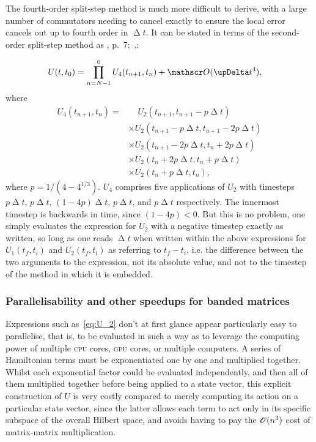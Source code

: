 The fourth-order split-step method is much more difficult to derive, with a large number of commutators needing to cancel exactly to ensure the local error cancels out up to fourth order in $\upDelta t$. It can be stated in terms of the second-order split-step method as 
\citeleft{}, p.~7;~,\citeright:

\begin{align}
U(t, t_0) &= \prod_{n=N-1}^0 U_4(t_{n+1}, t_n) + \Ord{\upDelta t^4},
\end{align}
where
\begin{align}\label{eq:U_4}
U_4(t_{n+1}, t_n) =
&\phantom{\times}
U_2(t_{n+1}, t_{n+1} - p\upDelta t)\nonumber\\
&\times
U_2(t_{n+1} - p\upDelta t, t_{n+1} - 2p\upDelta t)\nonumber\\
&\times
U_2(t_{n+1} - 2p\upDelta t, t_n + 2p\upDelta t)\nonumber\\
&\times
U_2(t_n + 2p\upDelta t, t_n + p\upDelta t)\nonumber\\
&\times
U_2(t_n + p\upDelta t, t_n),
\end{align}
where $p = 1/(4 - 4^{1/3})$. $U_4$ comprises five applications of $U_2$ with timesteps $p\upDelta t$, $p\upDelta t$, $(1 - 4p)\upDelta t$, $p\upDelta t$, and $p\upDelta t$ respectively. The innermost timestep is backwards in time, since $(1 - 4p) < 0$. But this is no problem, one simply evaluates the expression for $U_2$ with a negative timestep exactly as written, so long as one reads $\upDelta t$ when written within the above expressions for $U_1(t_f, t_i)$ and $U_2(t_f, t_i)$ as referring to $t_f - t_i$, i.e. the difference between the two arguments to the expression, not its absolute value, and not to the timestep of the method in which it is embedded.

\subsubsection{Parallelisability and other speedups for banded matrices}\label{sec:split-step-parallel}

Expressions such as~\eqref{eq:U_2} don't at first glance appear particularly easy to parallelise, that is, to be evaluated in such a way as to leverage the computing power of multiple \textsc{cpu} cores, \textsc{gpu} cores, or multiple computers. A series of Hamiltonian terms must be exponentiated one by one and multiplied together. Whilst each exponential factor could be evaluated independently, and then all of them multiplied together before being applied to a state vector, this explicit construction of $U$ is very costly compared to merely computing its action on a particular state vector, since the latter allows each term to act only in its specific subspace of the overall Hilbert space, and avoids having to pay the $\mathscr{O}(n^3)$ cost of matrix-matrix multiplication.

